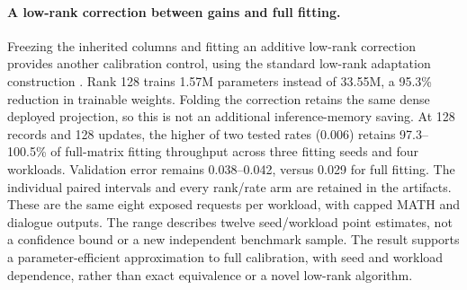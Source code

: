 \paragraph{A low-rank correction between gains and full fitting.}
Freezing the inherited columns and fitting an additive low-rank correction
provides another calibration control, using the standard low-rank
adaptation construction \citep{hu2022lora}. Rank 128 trains 1.57M parameters
instead of 33.55M, a 95.3\% reduction in trainable weights. Folding the
correction retains the same dense deployed projection, so this is not
an additional inference-memory saving. At 128 records and 128 updates,
the higher of two tested rates (0.006) retains 97.3--100.5\% of full-matrix
fitting throughput across three fitting seeds and four workloads.
Validation error remains 0.038--0.042, versus 0.029 for full fitting.
The individual paired intervals and every rank/rate arm are retained in
the artifacts. These are the same eight exposed requests per workload,
with capped MATH and dialogue outputs. The range describes twelve
seed/workload point estimates, not a confidence bound or a new independent
benchmark sample. The result supports a parameter-efficient approximation
to full calibration, with seed and workload dependence, rather than exact
equivalence or a novel low-rank algorithm.
